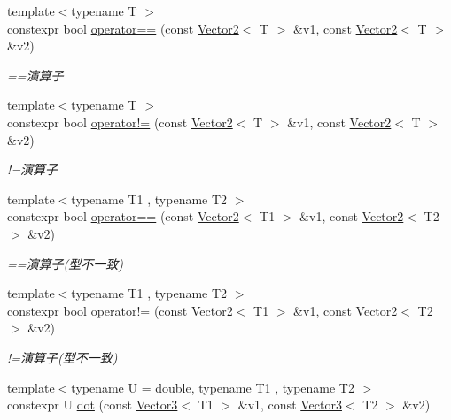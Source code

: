 \begin{DoxyCompactItemize}
{\footnotesize template$<$typename T $>$ }\\constexpr bool \mbox{\hyperlink{namespacesaki_aebe3f4c69f62ec8edc68723c5194c3b9}{operator==}} (const \mbox{\hyperlink{classsaki_1_1_vector2}{Vector2}}$<$ T $>$ \&v1, const \mbox{\hyperlink{classsaki_1_1_vector2}{Vector2}}$<$ T $>$ \&v2)
\begin{DoxyCompactList}\small\item\em ==演算子 \end{DoxyCompactList}\item 
{\footnotesize template$<$typename T $>$ }\\constexpr bool \mbox{\hyperlink{namespacesaki_a6ff1956703c2dfeebb0d188d9c34b033}{operator!=}} (const \mbox{\hyperlink{classsaki_1_1_vector2}{Vector2}}$<$ T $>$ \&v1, const \mbox{\hyperlink{classsaki_1_1_vector2}{Vector2}}$<$ T $>$ \&v2)
\begin{DoxyCompactList}\small\item\em !=演算子 \end{DoxyCompactList}\item 
{\footnotesize template$<$typename T1 , typename T2 $>$ }\\constexpr bool \mbox{\hyperlink{namespacesaki_a033d4b861140a6c00a8cb56ad71d463a}{operator==}} (const \mbox{\hyperlink{classsaki_1_1_vector2}{Vector2}}$<$ T1 $>$ \&v1, const \mbox{\hyperlink{classsaki_1_1_vector2}{Vector2}}$<$ T2 $>$ \&v2)
\begin{DoxyCompactList}\small\item\em ==演算子(型不一致) \end{DoxyCompactList}\item 
{\footnotesize template$<$typename T1 , typename T2 $>$ }\\constexpr bool \mbox{\hyperlink{namespacesaki_a778d46d9fe6118407c686cc3c3c61ac7}{operator!=}} (const \mbox{\hyperlink{classsaki_1_1_vector2}{Vector2}}$<$ T1 $>$ \&v1, const \mbox{\hyperlink{classsaki_1_1_vector2}{Vector2}}$<$ T2 $>$ \&v2)
\begin{DoxyCompactList}\small\item\em !=演算子(型不一致) \end{DoxyCompactList}\item 
{\footnotesize template$<$typename U  = double, typename T1 , typename T2 $>$ }\\constexpr U \mbox{\hyperlink{namespacesaki_a4f2643c9bd618538a43cdad4a71398af}{dot}} (const \mbox{\hyperlink{classsaki_1_1_vector3}{Vector3}}$<$ T1 $>$ \&v1, const \mbox{\hyperlink{classsaki_1_1_vector3}{Vector3}}$<$ T2 $>$ \&v2)

\end{DoxyCompactItemize}
